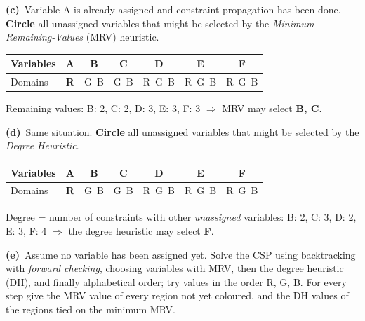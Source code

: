 \documentclass[11pt,a4paper]{article}
\newcommand{\subq}[1]{\par\smallskip\noindent\textbf{#1}\ }
\begin{document}
\subq{(c)}Variable A is already assigned and constraint propagation has been done. \textbf{Circle} all unassigned variables that might be selected by the \emph{Minimum-Remaining-Values} (MRV) heuristic.\begin{center}\small\begin{tabular}{|l|c|c|c|c|c|c|}\hline Variables & \textbf{A} & \textbf{B} & \textbf{C} & \textbf{D} & \textbf{E} & \textbf{F}\\ \hline Domains & \textbf{R} & G\ B & G\ B & R\ G\ B & R\ G\ B & R\ G\ B\\ \hline\end{tabular}\end{center}
\begin{solbox}
Remaining values: B: 2, C: 2, D: 3, E: 3, F: 3 $\Rightarrow$ MRV may select \textbf{B, C}.
\end{solbox}
\subq{(d)}Same situation. \textbf{Circle} all unassigned variables that might be selected by the \emph{Degree Heuristic}.\begin{center}\small\begin{tabular}{|l|c|c|c|c|c|c|}\hline Variables & \textbf{A} & \textbf{B} & \textbf{C} & \textbf{D} & \textbf{E} & \textbf{F}\\ \hline Domains & \textbf{R} & G\ B & G\ B & R\ G\ B & R\ G\ B & R\ G\ B\\ \hline\end{tabular}\end{center}
\begin{solbox}
Degree = number of constraints with other \emph{unassigned} variables: B: 2, C: 3, D: 2, E: 3, F: 4 $\Rightarrow$ the degree heuristic may select \textbf{F}.
\end{solbox}
\subq{(e)}Assume no variable has been assigned yet. Solve the CSP using backtracking with \emph{forward checking}, choosing variables with MRV, then the degree heuristic (DH), and finally alphabetical order; try values in the order R, G, B. For every step give the MRV value of every region not yet coloured, and the DH values of the regions tied on the minimum MRV.
\end{document}
